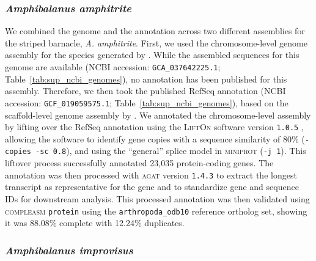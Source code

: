 \documentclass[11pt]{article}
\begin{document}
\subsubsection*{\textit{Amphibalanus amphitrite}}

We combined the genome and the annotation across two different assemblies for the
striped barnacle, \textit{A. amphitrite}.
First, we used the chromosome-level genome assembly for the species generated by
\cite{han_new_2024}.
While the assembled sequences for this genome are available (NCBI accession:
\texttt{GCA\_037642225.1}; Table~\ref{tab:sup_ncbi_genomes}), no annotation has
been published for this assembly.
Therefore, we then took the published RefSeq annotation (NCBI accession:
\texttt{GCF\_019059575.1}; Table~\ref{tab:sup_ncbi_genomes}), based on the
scaffold-level genome assembly by \cite{kim_draft_2019}.
We annotated the chromosome-level assembly by lifting over the RefSeq annotation using
the \textsc{LiftOn} software version \texttt{1.0.5} \citep{chao_lifton_2024},
allowing the software to identify gene copies with a sequence similarity of 80\%
(\texttt{-copies -sc 0.8}), and using the ``general'' splice model in
\textsc{miniprot} (\texttt{-j 1}).
This liftover process successfully annotated 23,035 protein-coding genes.
The annotation was then processed with \textsc{agat} version \texttt{1.4.3} to
extract the longest transcript as representative for the gene and to standardize gene
and sequence IDs for downstream analysis.
This processed annotation was then validated using \textsc{compleasm} \texttt{protein}
using the \texttt{arthropoda\_odb10} reference ortholog set, showing it was 88.08\%
complete with 12.24\% duplicates.

\subsubsection*{\textit{Amphibalanus improvisus}}
\end{document}

